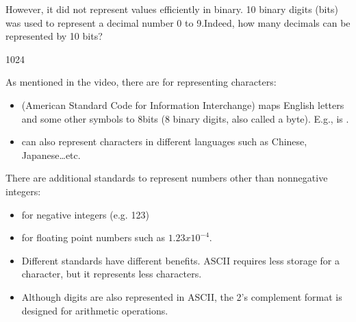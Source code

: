 \documentclass[letterpaper,10pt,english]{sphinxmanual}
\begin{document}
However, it did not represent values efficiently in binary. 10 binary digits (bits) was used to represent a decimal number 0 to 9.Indeed, how many decimals can be represented by 10 bits?

\begin{sphinxVerbatim}[commandchars=\\\{\}]
   
\end{sphinxVerbatim}

\begin{sphinxVerbatim}[commandchars=\\\{\}]
1024
\end{sphinxVerbatim}

As mentioned in the video, there are  for representing characters:
\begin{itemize}
\item {} 
 (American Standard Code for Information Interchange) maps English letters and some other symbols to 8\sphinxhyphen{}bits (8 binary digits, also called a byte). E.g.,  is .

\item {} 
 can also represent characters in different languages such as Chinese, Japanese…etc.

\end{itemize}

There are additional standards to represent numbers other than non\sphinxhyphen{}negative integers:
\begin{itemize}
\item {} 
 for negative integers (e.g. \sphinxhyphen{}123)

\item {} 
 for floating point numbers such as \(1.23 x 10^{-4}\).

\end{itemize}

\begin{itemize}
\item {} 
Different standards have different benefits. ASCII requires less storage for a character, but it represents less characters.

\item {} 
Although digits are also represented in ASCII, the 2’s complement format is designed for arithmetic operations.

\end{itemize}
\end{document}
